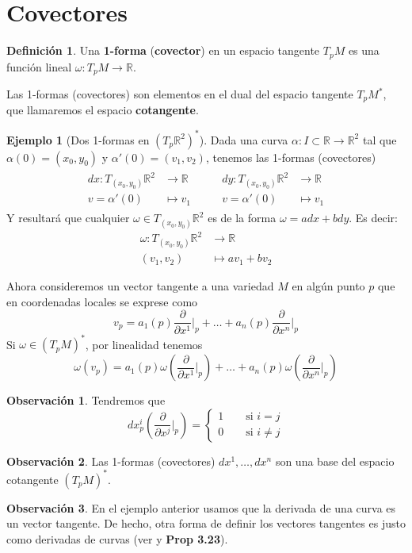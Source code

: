 \documentclass[spanish]{book}
\theoremstyle{definition}
\newtheorem*{defn}{Definición}
\newtheorem*{obs}{Observación}
\newtheorem*{ejem}{Ejemplo}
\newcommand{\R}{\mathbb{R}}
\begin{document}
	\section{Covectores}
	\begin{defn}
		Una \textbf{1-forma} (\textbf{covector}) en un espacio tangente $T_pM$ es una función lineal $\omega:T_pM\to\R$.
	\end{defn}
	Las 1-formas (covectores) son elementos en el dual del espacio tangente $T_pM^*$, que llamaremos el espacio \textbf{cotangente}.
	\begin{ejem}[Dos 1-formas en $(T_p\R^2)^*$]
		Dada una curva $\alpha:I\subset\R\to\R^2$ tal que $\alpha(0)=(x_0,y_0)$ y $\alpha'(0)=(v_1,v_2)$, tenemos las 1-formas (covectores)
		\begin{align*}
			\begin{aligned}
				dx:T_{(x_0,y_0)}\R^2&\to\R\\
				v=\alpha'(0)&\mapsto v_1
			\end{aligned}
			\qquad
			\begin{aligned}
				dy:T_{(x_0,y_0)}\R^2&\to\R\\
				v=\alpha'(0)&\mapsto v_1
			\end{aligned}
		\end{align*}
		Y resultará que cualquier $\omega\in T_(x_0,y_0)\R^2$ es de la forma $\omega=adx+bdy$. Es decir:
		\begin{align*}
			\omega:T_{(x_0,y_0)}\R^2&\to\R\\
			(v_1,v_2)&\mapsto av_1+bv_2
		\end{align*}
	\end{ejem}
	Ahora consideremos un vector tangente a una variedad $M$ en algún punto $p$ que en coordenadas locales se exprese como
	\[v_p=a_1(p)\frac{\partial}{\partial x^1}\Big|_p+\ldots+a_n(p)\frac{\partial}{\partial x^n}\Big|_p\]
	Si $\omega\in(T_pM)^*$, por linealidad tenemos
	\[\omega(v_p)=a_1(p)\omega\left(\frac{\partial}{\partial x^1}\Big|_p\right)+\ldots+a_n(p)\omega\left(\frac{\partial}{\partial x^n}\Big|_p\right)\]
	\begin{obs}
		Tendremos que
		\[dx_p^i\left(\frac{\partial}{\partial x^j}\Big|_p\right)=\begin{cases}
			1\qquad\text{si }i=j\\
			0\qquad\text{si }i\neq j
		\end{cases}\]
	\end{obs}
	\begin{obs}
		Las 1-formas (covectores) $dx^1,\ldots,dx^n$ son una base del espacio cotangente $(T_pM)^*$.
	\end{obs}
	\begin{obs}
		En el ejemplo anterior usamos que la derivada de una curva es un vector tangente. De hecho, otra forma de definir los vectores tangentes es justo como derivadas de curvas (ver \cite{DoCarmo} y \cite{Lee} \textbf{Prop 3.23}).
	\end{obs}
	
\end{document}
